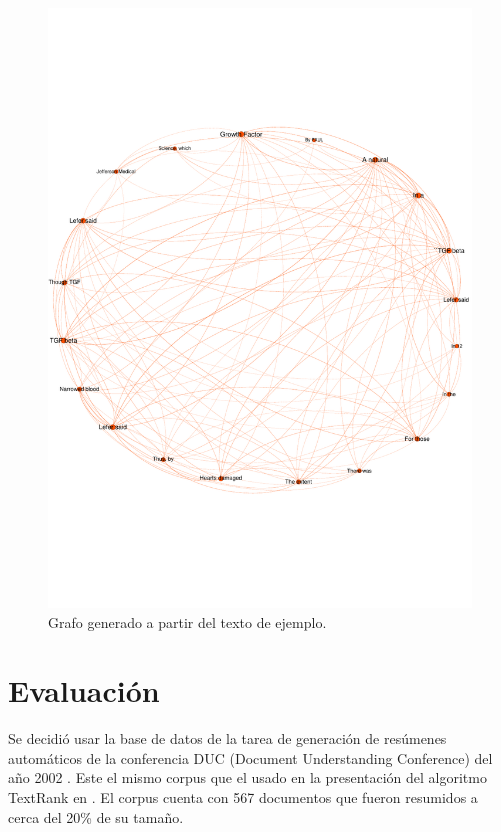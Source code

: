 \documentclass{llncs}
\begin{document}
\begin{figure}[h!]
    \centering
    \includegraphics[trim = 0mm 50mm 0mm 50mm, clip, scale=0.15,width=1\textwidth]{Untitled.pdf}
    \caption{Grafo generado a partir del texto de ejemplo.}
\end{figure}


\section{Evaluación}
Se decidió usar la base de datos de la tarea de generación de resúmenes automáticos de la conferencia DUC (Document Understanding Conference) del año 2002 \cite{duc2002-guidelines}. Este el mismo corpus que el usado en la presentación del algoritmo TextRank en \cite{mihalcea-tarau}. El corpus cuenta con 567 documentos que fueron resumidos a cerca del 20\% de su tamaño.
\end{document}
